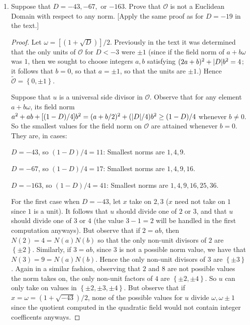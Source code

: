\documentclass[11pt]{article}
\newcommand{\cbr}[1]{\left\{#1\right\}}
\begin{document}
\begin{enumerate}
\begin{enumerate}[label=(\alph*)]
\begin{proof}
        Thus for $D = -1,-2,-3,-7,$ or $-11$, the associated quadratic integer ring $\mathcal{O}$ of the quadratic field $F = \mathbb{Q}[\sqrt{D}]$ is a Euclidean Domain with respect to the field norm $N$.
        \end{proof}
        \item Suppose that $D = -43, -67,$ or $-163$. Prove that $\mathcal{O}$ is not a Euclidean Domain with respect to any norm. [Apply the same proof as for $D = -19$ in the text.]
        \begin{proof} Let $\omega = [(1+\sqrt{D})]/2$.
          Previously in the text it was determined that the only units of $\mathcal{O}$ for $D < -3$ were $\pm 1$ (since if the field norm of $a+b\omega$ was $1$, then we sought to choose integers $a,b$ satisfying $(2a+b)^2 + \abs{D}b^2 = 4$; it follows that $b=0$, so that $a= \pm 1$, so that the units are $\pm 1$.) Hence $\widetilde{\mathcal{O}} = \cbr{0,\pm 1}$.

          Suppose that $u$ is a universal side divisor in $\mathcal{O}$. Observe that for any element $a+b\omega$, its field norm $a^2+ab+[(1-D)/4]b^2 = (a+b/2)^2 + (\abs{D}/4)b^2 \geq (1-D)/4$ whenever $b\neq 0$. So the smallest values for the field norm on $\mathcal{O}$ are attained whenever $b = 0$. They are, in cases:

          $D = -43$, so $(1-D)/4 = 11$: Smallest norms are $1, 4, 9$.
          
          $D = -67$, so $(1-D)/4 = 17$: Smallest norms are $1,4,9,16$.

          $D = -163$, so $(1-D)/4 = 41$: Smallest norms are $1,4,9,16, 25, 36$.

          For the first case when $D = -43$, let $x$ take on $2,3$ ($x$ need not take on $1$ since $1$ is a unit). It follows that $u$ should divide one of $2$ or $3$, and that $u$ should divide one of $3$ or $4$ (the value $3-1 = 2$ will be handled in the first computation anyways). But observe that if $2 = ab$, then $N(2) = 4 = N(a)N(b)$ so that the only non-unit divisors of $2$ are $\cbr{\pm 2}$. Similarly, if $3 = ab$, since $3$ is not a possible norm value, we have that $N(3) = 9 = N(a)N(b)$. Hence the only non-unit divisors of $3$ are $\cbr{\pm 3}$. Again in a similar fashion, observing that $2$ and $8$ are not possible values the norm takes on, the only non-unit factors of $4$ are $\cbr{\pm 2, \pm 4}$. So $u$ can only take on values in $\cbr{\pm 2, \pm 3, \pm 4}$. But observe that if $x = \omega = (1+\sqrt{-43})/2$, none of the possible values for $u$ divide $\omega, \omega \pm 1$ since the quotient computed in the quadratic field would not contain integer coefficents anyways.


\end{proof}
\end{enumerate}
\end{enumerate}
\end{document}
